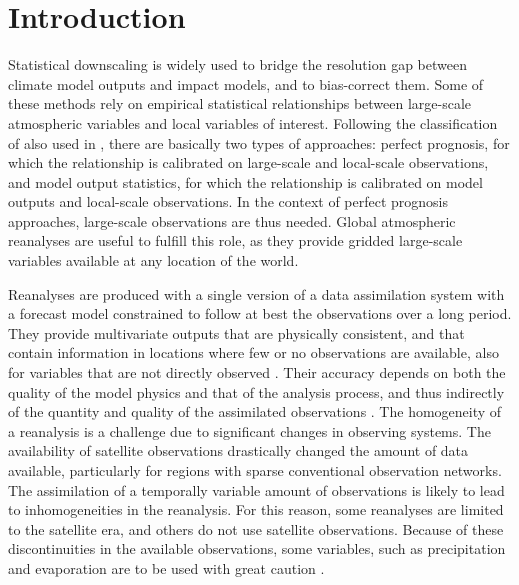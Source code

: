 \documentclass{ametsoc}
\begin{document}




\section{Introduction}

Statistical downscaling is widely used to bridge the resolution gap between climate model outputs and impact models, and to bias-correct them. Some of these methods rely on empirical statistical relationships between large-scale atmospheric variables and local variables of interest. Following the classification of \citet{Rummukainen1997} also used in \citet{Maraun2010}, there are basically two types of approaches: perfect prognosis, for which the relationship is calibrated on large-scale and local-scale observations, and model output statistics, for which the relationship is calibrated on model outputs and local-scale observations. In the context of perfect prognosis approaches, large-scale observations are thus needed. Global atmospheric reanalyses are useful to fulfill this role, as they provide gridded large-scale variables available at any location of the world.

Reanalyses are produced with a single version of a data assimilation system with a forecast model constrained to follow at best the observations over a long period. They provide multivariate outputs that are physically consistent, and that contain information in locations where few or no observations are available, also for variables that are not directly observed \citep{Gelaro2017}. Their accuracy depends on both the quality of the model physics and that of the analysis process, and thus indirectly of the quantity and quality of the assimilated observations \citep{Dee2011a}. The homogeneity of a reanalysis is a challenge due to significant changes in observing systems. The availability of satellite observations drastically changed the amount of data available, particularly for regions with sparse conventional observation networks. The assimilation of a temporally variable amount of observations is likely to lead to inhomogeneities in the reanalysis. For this reason, some reanalyses are limited to the satellite era, and others do not use satellite observations. Because of these discontinuities in the available observations, some variables, such as precipitation and evaporation are to be used with great caution \citep{Kobayashi2015}.
\end{document}
